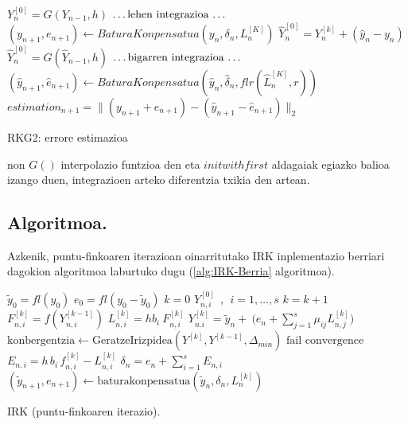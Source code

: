 \begin{algorithm}[h]
  \BlankLine
  {
    \BlankLine
    $Y_n^{[0]}=G(Y_{n-1},h)$\;
    \BlankLine
    $\text{\dots lehen integrazioa \dots}$\;
	\BlankLine
    $(y_{n+1},e_{n+1})\leftarrow BaturaKonpensatua(y_n,\delta_n,L_n^{[K]})$\;      
    \BlankLine
    \BlankLine
    {$\hat{Y}_{n}^{[0]}=Y_{n}^{[k]}+(\hat{y}_n-y_n)$\;}
    {$\hat{Y}_{n}^{[0]}=G(\hat{Y}_{n-1},h)$\;}
    \BlankLine
    $\text{\dots bigarren integrazioa \dots}$\;
	\BlankLine
    $(\hat{y}_{n+1},\hat{e}_{n+1})\leftarrow BaturaKonpensatua(\hat{y}_n,\hat{\delta}_n,flr(\hat{L}_n^{[K]},r))$\;  
    \BlankLine
    \BlankLine
    $estimation_{n+1}=\|(y_{n+1}+e_{n+1})-(\hat{y}_{n+1}-\hat{e}_{n+1})\|_2$\;
    \BlankLine
   }
 \caption{RKG2: errore estimazioa}
 \label{alg:errore-estimazioa}
\end{algorithm}
non $G()$ interpolazio funtzioa den eta $initwithfirst$ aldagaiak egiazko balioa izango duen, integrazioen arteko diferentzia txikia den artean.

\subsection{Algoritmoa.}

Azkenik, puntu-finkoaren iterazioan oinarritutako IRK inplementazio berriari dagokion algoritmoa laburtuko dugu (\ref{alg:IRK-Berria} algoritmoa).

\begin{algorithm}[H]
 \BlankLine
  $\tilde{y}_0=fl(y_0)$\;
  $e_0=fl(y_0-\tilde{y}_0)$\;
  {
   \BlankLine
   $k=0$\;
     $Y_{n,i}^{[0]} \ \ , \ \ i=1,\dots,s $\;
   \BlankLine
   {
    \BlankLine 
    $k=k+1$\;
    $F_{n,i}^{[k]}=f(Y_{n,i}^{[k-1]}) $\;
    $L_{n,i}^{[k]}=hb_i \ F_{n,i}^{[k]} $\;
    $Y_{n.i}^{[k]}=\tilde{y}_{n} + \ \big(e_n+\sum\limits_{j=1}^{s} \mu_{ij} L_{n,j}^{[k]}\big)  $\;  
    $\text{konbergentzia} \leftarrow \text{GeratzeIrizpidea}(Y^{[k]},Y^{[k-1]},\Delta_{min}) $\;
   }
   \BlankLine
   {
   {$\text{fail convergence}$\;}
   }
   $E_{n,i} = h\,   b_i\,f_{n,i}^{[k]}-L_{n,i}^{[k]}$\;
   $\delta_{n}=e_{n}+\sum_{i=1}^{s} E_{n,i}$\;
   $(\tilde y_{n+1}, e_{n+1})\leftarrow \text{baturakonpensatua}(\tilde y_{n},\delta_{n},L_{n}^{[k]})$\;
   \BlankLine
 }
 \caption{IRK (puntu-finkoaren iterazio).}
 \label{alg:IRK-Berria}
\end{algorithm}

